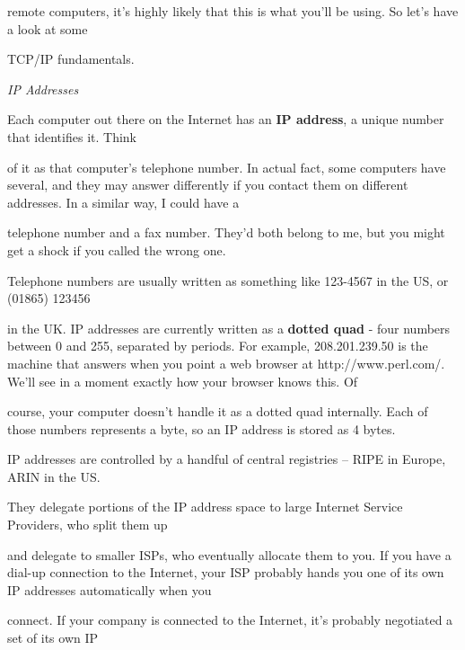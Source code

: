 \documentclass[a4paper,11pt]{book}
\begin{document}
\noindent remote computers,  it's highly likely  that  this  is  what  you'll  be  using.  So  let's  have  a  look at  some

\noindent TCP/IP fundamentals.

\noindent 

\noindent 

\noindent \textit{IP Addresses}

\noindent Each  computer out there on  the  Internet  has  an  \textbf{IP address},  a  unique  number  that  identifies  it.  Think

\noindent of it as that computer's telephone  number.  In  actual  fact,  some  computers  have  several,  and  they may answer differently  if you  contact  them  on  different  addresses.  In  a  similar  way,  I  could  have a

\noindent telephone number and  a fax  number.  They'd  both  belong  to  me,  but you  might  get  a  shock  if  you called the wrong one.

\noindent 

\noindent Telephone numbers are usually written as something like 123-4567 in the US, or (01865) 123456

\noindent in the UK. IP addresses are currently written as a \textbf{dotted quad }- four numbers between 0 and 255, separated by periods. For example, 208.201.239.50 is the machine that answers when you point a web browser at http://www.perl.com/. We'll see in a moment exactly how your browser knows this. Of

\noindent course, your computer doesn't handle it as a dotted quad internally. Each of those numbers represents a byte, so an IP address is stored as 4 bytes.

\noindent 

\noindent IP  addresses are controlled by  a  handful  of  central  registries  --  RIPE  in  Europe,  ARIN  in  the  US.

\noindent They delegate  portions of the  IP  address  space  to  large  Internet  Service  Providers,  who  split  them  up

\noindent and  delegate to  smaller ISPs,  who  eventually  allocate  them  to  you.  If  you  have  a  dial-up  connection  to the Internet,  your ISP  probably  hands  you  one  of its  own  IP  addresses  automatically  when  you

\noindent connect.  If  your  company is connected  to  the  Internet,  it's  probably  negotiated  a  set of  its  own IP
\end{document}
